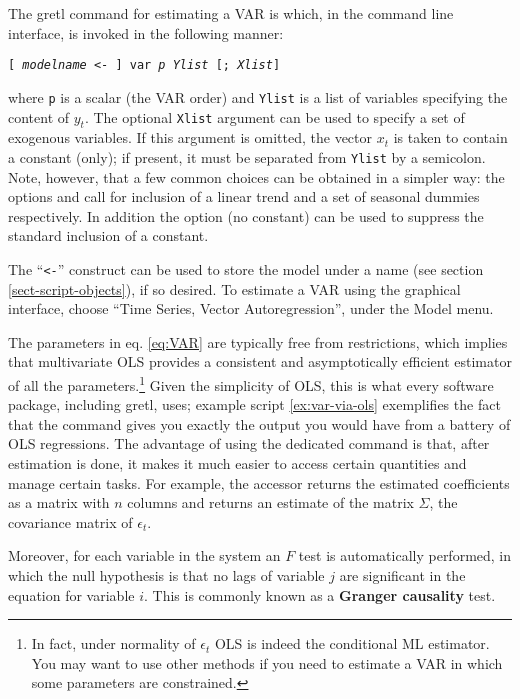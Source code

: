 The gretl command for estimating a VAR is  which, in
the command line interface, is invoked in the following manner:
\begin{flushleft}
    \texttt{[ \emph{modelname} \textless - ] var \emph{p} \emph{Ylist} [;
    \emph{Xlist}]}
\end{flushleft}
where \texttt{p} is a scalar (the VAR order) and \texttt{Ylist} is a
list of variables specifying the content of $y_t$.  The optional
\texttt{Xlist} argument can be used to specify a set of exogenous
variables. If this argument is omitted, the vector $x_t$ is taken to
contain a constant (only); if present, it must be separated from
\texttt{Ylist} by a semicolon. Note, however, that a few common
choices can be obtained in a simpler way: the options 
and  call for inclusion of a linear trend and a set
of seasonal dummies respectively. In addition the  option
(no constant) can be used to suppress the standard inclusion of a
constant.

The ``\texttt{\textless -}'' construct can be used to store the model
under a name (see section \ref{sect-script-objects}), if so
desired. To estimate a VAR using the graphical interface, choose
``Time Series, Vector Autoregression'', under the Model menu.

The parameters in eq. \eqref{eq:VAR} are typically free from
restrictions, which implies that multivariate OLS provides a
consistent and asymptotically efficient estimator of all the
parameters.\footnote{In fact, under normality of $\epsilon_t$ OLS is
  indeed the conditional ML estimator. You may want to use other
  methods if you need to estimate a VAR in which some parameters are
  constrained.}  Given the simplicity of OLS, this is what every
software package, including gretl, uses; example script
\ref{ex:var-via-ols} exemplifies the fact that the  command
gives you exactly the output you would have from a battery of OLS
regressions. The advantage of using the dedicated command is that,
after estimation is done, it makes it much easier to access certain
quantities and manage certain tasks. For example, the 
accessor returns the estimated coefficients as a matrix with $n$
columns and  returns an estimate of the matrix $\Sigma$,
the covariance matrix of $\epsilon_t$. 

Moreover, for each variable in the system an $F$ test is automatically
performed, in which the null hypothesis is that no lags of variable
$j$ are significant in the equation for variable $i$. This is commonly
known as a \textbf{Granger causality} test.

